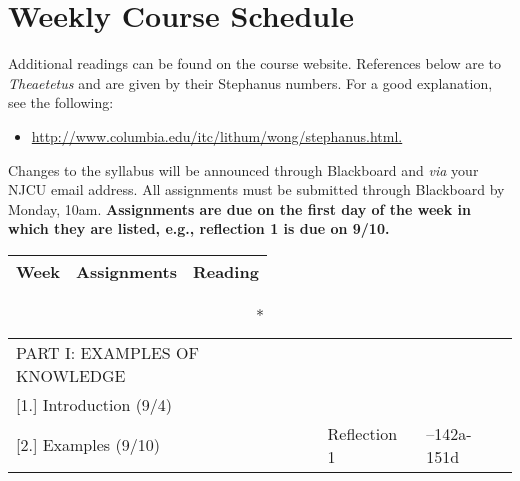 \documentclass[article,oneside]{memoir}
\begin{document}
\section{Weekly Course Schedule}
Additional readings can be found on the course website. References below are to  \emph{Theaetetus} and are given by their Stephanus numbers. For a good explanation, see the following: 
\begin{itemize}
\item \href{http://www.columbia.edu/itc/lithum/wong/stephanus.html}{http://www.columbia.edu/itc/lithum/wong/stephanus.html.}  
\end{itemize}
Changes to the syllabus will be announced through Blackboard and \emph{via} your NJCU email address.  All assignments must be submitted through Blackboard by Monday, 10am. \textbf{Assignments are due on the first day of the week in which they are listed, e.g., reflection 1 is due on 9/10.}  
						
\begin{center}
\begin{longtable}{p{6cm}p{3cm}p{5cm}} 
  \toprule
  \textbf{Week} &\textbf{Assignments} & \textbf{Reading} \\
  \midrule
\end{longtable}
\end{center} 
\vspace{-1.5cm}

\begin{center}
\begin{longtable}{p{6cm}p{3cm}p{5cm}}
 
\caption*{PART I: EXAMPLES OF KNOWLEDGE	} \\

[1.] Introduction	(9/4)	  			& 	 			&   \\


[2.] Examples (9/10)				& 	Reflection 1 			& --142a-151d \\
\end{longtable}
\end{center} 
\vspace{-1.5cm}
\end{document}
